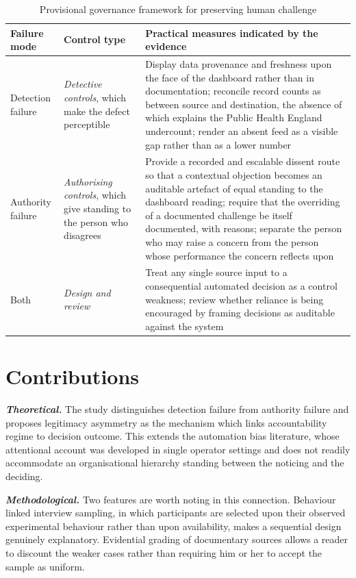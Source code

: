 \documentclass[12pt,a4paper]{article}
\begin{document}
\begin{table}[H]
\centering\footnotesize
\caption{Provisional governance framework for preserving human challenge}
\label{tab:gov}
\begin{tabularx}{\textwidth}{@{}p{2.6cm} p{3.5cm} X@{}}
\toprule
\textbf{Failure mode} & \textbf{Control type} & \textbf{Practical measures indicated by the evidence} \\
\midrule
Detection failure & \emph{Detective controls}, which make the defect perceptible & Display data provenance
and freshness upon the face of the dashboard rather than in documentation; reconcile record counts as
between source and destination, the absence of which explains the Public Health England undercount; render
an absent feed as a visible gap rather than as a lower number \\
\addlinespace
Authority failure & \emph{Authorising controls}, which give standing to the person who disagrees & Provide
a recorded and escalable dissent route so that a contextual objection becomes an auditable artefact of
equal standing to the dashboard reading; require that the overriding of a documented challenge be itself
documented, with reasons; separate the person who may raise a concern from the person whose performance the
concern reflects upon \\
\addlinespace
Both & \emph{Design and review} & Treat any single source input to a consequential automated decision as a
control weakness; review whether reliance is being encouraged by framing decisions as auditable against the
system \\
\bottomrule
\end{tabularx}
\end{table}

\section{Contributions}

\textbf{\emph{Theoretical.}} The study distinguishes detection failure from authority failure and proposes
legitimacy asymmetry as the mechanism which links accountability regime to decision outcome. This extends
the automation bias literature, whose attentional account was developed in single operator settings and
does not readily accommodate an organisational hierarchy standing between the noticing and the deciding.

\textbf{\emph{Methodological.}} Two features are worth noting in this connection. Behaviour linked
interview sampling, in which participants are selected upon their observed experimental behaviour rather
than upon availability, makes a sequential design genuinely explanatory. Evidential grading of documentary
sources allows a reader to discount the weaker cases rather than requiring him or her to accept the sample
as uniform.
\end{document}
